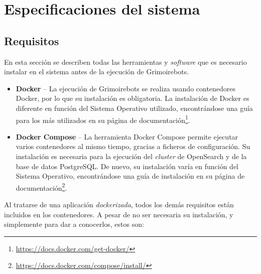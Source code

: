 
\chapter{Especificaciones del sistema} %

\label{Chapter4} %


\section{Requisitos}

En esta sección se describen todas las herramientas y \emph{software} que es necesario instalar en el sistema antes de la ejecución de Grimoirebots.

\begin{itemize}
    \item \textbf{Docker} -- La ejecución de Grimoirebots se realiza usando contenedores Docker, por lo que su instalación es obligatoria. La instalación de Docker es diferente en función del Sistema Operativo utilizado, encontrándose una guía para los más utilizados en su página de documentación\footnote{\url{https://docs.docker.com/get-docker/}}.
    \item \textbf{Docker Compose} -- La herramienta Docker Compose permite ejecutar varios contenedores al mismo tiempo, gracias a ficheros de configuración. Su instalación es necesaria para la ejecución del \emph{cluster} de OpenSearch y de la base de datos PostgreSQL. De nuevo, su instalación varía en función del Sistema Operativo, encontrándose una guía de instalación en su página de documentación\footnote{\url{https://docs.docker.com/compose/install/}}.
\end{itemize}

Al tratarse de una aplicación \emph{dockerizada}, todos los demás requisitos están incluidos en los contenedores. A pesar de no ser necesaria su instalación, y simplemente para dar a conocerlos, estos son:

